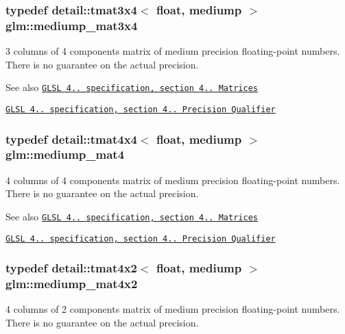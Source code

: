 \subsubsection[{\texorpdfstring{mediump\+\_\+mat3x4}{mediump_mat3x4}}]{\setlength{\rightskip}{0pt plus 5cm}typedef detail\+::tmat3x4$<$ float, mediump $>$ {\bf glm\+::mediump\+\_\+mat3x4}}\hypertarget{group__core__precision_ga5654236019c6a732844da31534a3cf28}{}\label{group__core__precision_ga5654236019c6a732844da31534a3cf28}
3 columns of 4 components matrix of medium precision floating-\/point numbers. There is no guarantee on the actual precision.

\begin{DoxySeeAlso}{See also}
\href{http://www.opengl.org/registry/doc/GLSLangSpec.4.20.8.pdf}{\tt G\+L\+SL 4.. specification, section 4.. Matrices} 

\href{http://www.opengl.org/registry/doc/GLSLangSpec.4.20.8.pdf}{\tt G\+L\+SL 4.. specification, section 4.. Precision Qualifier} 
\end{DoxySeeAlso}
\subsubsection[{\texorpdfstring{mediump\+\_\+mat4}{mediump_mat4}}]{\setlength{\rightskip}{0pt plus 5cm}typedef detail\+::tmat4x4$<$ float, mediump $>$ {\bf glm\+::mediump\+\_\+mat4}}\hypertarget{group__core__precision_gaf3de9a0400cf707d3c159f32902b92db}{}\label{group__core__precision_gaf3de9a0400cf707d3c159f32902b92db}
4 columns of 4 components matrix of medium precision floating-\/point numbers. There is no guarantee on the actual precision.

\begin{DoxySeeAlso}{See also}
\href{http://www.opengl.org/registry/doc/GLSLangSpec.4.20.8.pdf}{\tt G\+L\+SL 4.. specification, section 4.. Matrices} 

\href{http://www.opengl.org/registry/doc/GLSLangSpec.4.20.8.pdf}{\tt G\+L\+SL 4.. specification, section 4.. Precision Qualifier} 
\end{DoxySeeAlso}
\subsubsection[{\texorpdfstring{mediump\+\_\+mat4x2}{mediump_mat4x2}}]{\setlength{\rightskip}{0pt plus 5cm}typedef detail\+::tmat4x2$<$ float, mediump $>$ {\bf glm\+::mediump\+\_\+mat4x2}}\hypertarget{group__core__precision_ga5ade2a6a65653683f76988c45da39f15}{}\label{group__core__precision_ga5ade2a6a65653683f76988c45da39f15}
4 columns of 2 components matrix of medium precision floating-\/point numbers. There is no guarantee on the actual precision.

